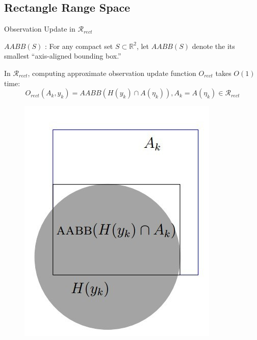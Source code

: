 \subsection[Rectangle Range Space]{Rectangle Range Space}
\begin{frame}{Observation Update in $\mathcal{R}_{rect}$}
  \begin{definition}{\textbf{$AABB(S)$} :}
    For any compact set $S \subset \mathbb{R}^2$, let $AABB(S)$ denote the its
    smallest ``axis-aligned bounding box.''
  \end{definition}

  In $\mathcal{R}_{rect}$, computing approximate observation update function $O_{rect}$ takes $O(1)$ time:\\
  $$ O_{rect}(A_k, y_k) = AABB(H(y_k) \cap A(\eta_k)), A_k = A(\eta_k) \in \mathcal{R}_{rect}$$
  \begin{figure}
    \includegraphics[scale=0.27]{figs/circlerect.jpg}
  \end{figure}
\end{frame}

